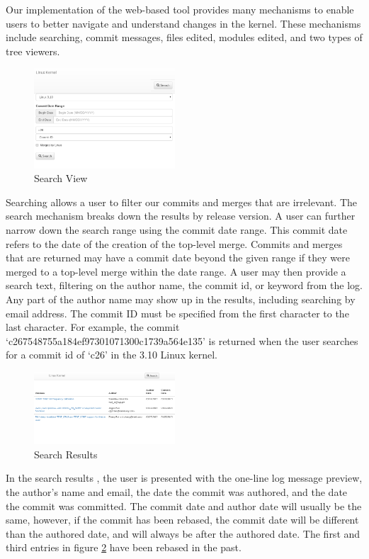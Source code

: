 \documentclass[conference, draftclsnofoot]{IEEEtran}
\begin{document}
Our implementation of the web-based tool provides many mechanisms to enable
users to better navigate and understand changes in the kernel. These mechanisms
include searching, commit messages, files edited, modules edited, and two types
of tree viewers.

\begin{figure}[h]
	\centering
	\includegraphics[width=0.47\textwidth]{figures/search.png}
	\caption{Search View}
	\label{fig:search}
\end{figure}

Searching allows a user to filter our commits and merges that are irrelevant.
The search mechanism breaks down the results by release version. A user can
further narrow down the search range using the commit date range. This commit
date refers to the date of the creation of the top-level merge. Commits and
merges that are returned may have a commit date beyond the given range if they
were merged to a top-level merge within the date range. A user may then provide
a search text, filtering on the author name, the commit id, or keyword from the
log. Any part of the author name may show up in the results, including
searching by email address. The commit ID must be specified from the first
character to the last character. For example, the commit
`c267548755a184ef97301071300c1739a564e135' is returned when the user searches
for a commit id of `c26' in the 3.10 Linux kernel.

\begin{figure}[h]
	\centering
	\includegraphics[width=0.47\textwidth]{figures/search_results.png}
	\caption{Search Results}
	\label{fig:results}
\end{figure}

In the search results , the user is presented with the one-line log message
preview, the author's name and email, the date the commit was authored, and the
date the commit was committed. 
The commit date and author date will usually be the same, however, if the
commit has been rebased, the commit date will be different than the authored
date, and will always be after the authored date. The first and third entries
in figure \ref{fig:results} have been rebased in the past. 
\end{document}
